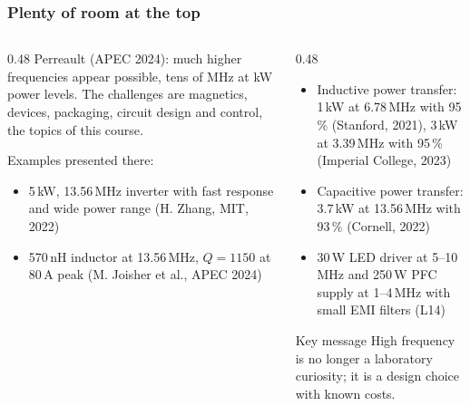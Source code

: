 \begin{frame}
	\frametitle{Plenty of room at the top}
	\begin{columns}[T]
		\begin{column}{0.48\textwidth}
			\small
			Perreault (APEC 2024): much higher frequencies appear possible, tens of MHz at kW power levels. The challenges are magnetics, devices, packaging, circuit design and control, the topics of this course.
			\vspace{0.2cm}

			Examples presented there:
			\begin{itemize}
				\item 5\,kW, 13.56\,MHz inverter with fast response and wide power range (H. Zhang, MIT, 2022)
				\item 570\,nH inductor at 13.56\,MHz, $Q=1150$ at 80\,A peak (M. Joisher et al., APEC 2024)
			\end{itemize}
		\end{column}
		\begin{column}{0.48\textwidth}
			\small
			\begin{itemize}
				\item Inductive power transfer: 1\,kW at 6.78\,MHz with 95\,\% (Stanford, 2021), 3\,kW at 3.39\,MHz with 95\,\% (Imperial College, 2023)
				\item Capacitive power transfer: 3.7\,kW at 13.56\,MHz with 93\,\% (Cornell, 2022)
				\item 30\,W LED driver at 5--10\,MHz and 250\,W PFC supply at 1--4\,MHz with small EMI filters (L14)
			\end{itemize}
			\begin{block}{Key message}
				High frequency is no longer a laboratory curiosity; it is a design choice with known costs.
			\end{block}
		\end{column}
	\end{columns}
\end{frame}

